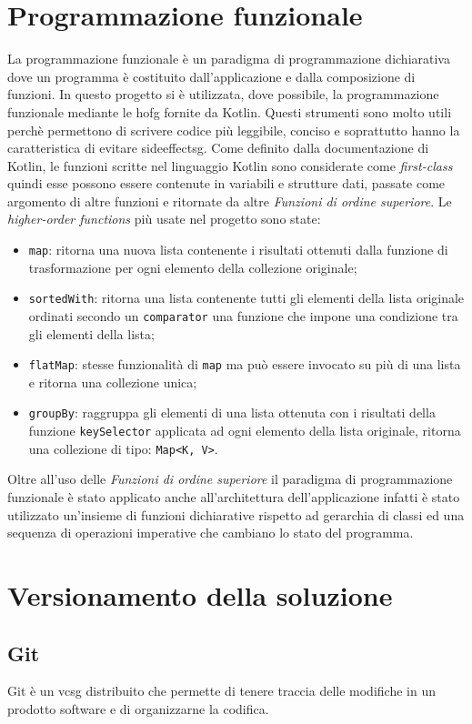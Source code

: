 \section{Programmazione funzionale}
La programmazione funzionale è un paradigma di programmazione dichiarativa dove un programma è costituito dall'applicazione e dalla composizione di funzioni. In questo progetto si è utilizzata, dove possibile, la programmazione funzionale mediante le \gls{hofg} fornite da Kotlin. Questi strumenti sono molto utili perchè permettono di scrivere codice più leggibile, conciso e soprattutto hanno la caratteristica di evitare \gls{sideeffectsg}. Come definito dalla documentazione di Kotlin, le funzioni scritte nel linguaggio Kotlin sono considerate come \emph{first-class} quindi esse possono essere contenute in variabili e strutture dati, passate come argomento di altre funzioni e ritornate da altre \emph{Funzioni di ordine superiore}. Le \emph{higher-order functions} più usate nel progetto sono state:
\begin{itemize}
	\item \verb|map|: ritorna una nuova lista contenente i risultati ottenuti dalla funzione di trasformazione per ogni elemento della collezione originale;
	\item \verb|sortedWith|: ritorna una lista contenente tutti gli elementi della lista originale ordinati secondo un \verb|comparator| una funzione che impone una condizione tra gli elementi della lista;
	\item \verb|flatMap|: stesse funzionalità di \verb|map| ma può essere invocato su più di una lista e ritorna una collezione unica;
	\item \verb|groupBy|: raggruppa gli elementi di una lista ottenuta con i risultati della funzione \verb|keySelector| applicata ad ogni elemento della lista originale, ritorna una collezione di tipo: \verb|Map<K, V>|.
\end{itemize}
Oltre all'uso delle \emph{Funzioni di ordine superiore} il paradigma di programmazione funzionale è stato applicato anche all'architettura dell'applicazione infatti è stato utilizzato un'insieme di funzioni dichiarative rispetto ad gerarchia di classi ed una sequenza di operazioni imperative che cambiano lo stato del programma.

\section{Versionamento della soluzione}
\subsection{Git}
Git è un \gls{vcsg} distribuito che permette di tenere traccia delle modifiche in un prodotto software e di organizzarne la codifica. 

